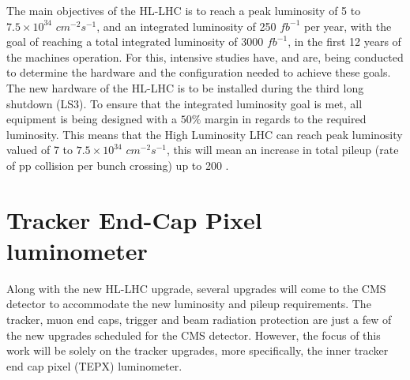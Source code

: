 The main objectives of the HL-LHC is to reach a peak luminosity of 5 to $7.5\times10^{34}$ $cm^{-2}s^{-1}$, and an integrated luminosity of 250 $fb^{-1}$ per year, with the goal of reaching a total integrated luminosity of 3000 $fb^{-1}$, in the first 12 years of the machines operation. For this, intensive studies have, and are, being conducted to determine the hardware and the configuration needed to achieve these goals.\\
The new hardware of the HL-LHC is to be installed during the third long shutdown (LS3). To ensure that the integrated luminosity goal is met, all equipment is being designed with a $50\%$ margin in regards to the required luminosity. This means that the High Luminosity LHC can reach peak luminosity valued of 7 to $7.5\times10^{34}$ $cm^{-2}s^{-1}$, this will mean an increase in total pileup (rate of pp collision per bunch crossing) up to 200 \cite{cern3}.




\section{Tracker End-Cap Pixel luminometer}

Along with the new HL-LHC upgrade, several upgrades will come to the CMS detector to accommodate the new luminosity and pileup requirements.  The tracker, muon end caps, trigger and beam radiation protection are just a few of the new upgrades scheduled for the CMS detector. However, the focus of this work will be solely on the tracker upgrades, more specifically, the inner  tracker end cap pixel (TEPX) luminometer.

